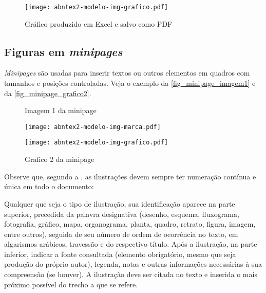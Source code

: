 \begin{figure}[htb]
  \caption{\label{fig_grafico}Gráfico produzido em Excel e salvo como PDF}
  \begin{center}
    \texttt{[image: abntex2-modelo-img-grafico.pdf]}
  \end{center}
\end{figure}

\subsection{Figuras em \emph{minipages}}

\emph{Minipages} são usadas para inserir textos ou outros elementos em quadros
com tamanhos e posições controladas. Veja o exemplo da
\autoref{fig_minipage_imagem1} e da \autoref{fig_minipage_grafico2}.

\begin{figure}[htb]
  \label{teste}
  \centering
  \begin{minipage}{0.4\textwidth}
    \centering
    \caption{Imagem 1 da minipage} \label{fig_minipage_imagem1}
    \texttt{[image: abntex2-modelo-img-marca.pdf]}
  \end{minipage}
  \hfill
  \begin{minipage}{0.4\textwidth}
    \centering
    \caption{Grafico 2 da minipage} \label{fig_minipage_grafico2}
    \texttt{[image: abntex2-modelo-img-grafico.pdf]}
  \end{minipage}
\end{figure}

Observe que, segundo a , as
ilustrações devem sempre ter numeração contínua e única em todo o documento:

\begin{citacao}
  Qualquer que seja o tipo de ilustração, sua identificação aparece na parte
  superior, precedida da palavra designativa (desenho, esquema, fluxograma,
  fotografia, gráfico, mapa, organograma, planta, quadro, retrato, figura,
  imagem, entre outros), seguida de seu número de ordem de ocorrência no texto,
  em algarismos arábicos, travessão e do respectivo título. Após a ilustração, na
  parte inferior, indicar a fonte consultada (elemento obrigatório, mesmo que
  seja produção do próprio autor), legenda, notas e outras informações
  necessárias à sua compreensão (se houver). A ilustração deve ser citada no
  texto e inserida o mais próximo possível do trecho a que se
  refere. \cite[seções 5.8]{NBR14724:2011}
\end{citacao}

